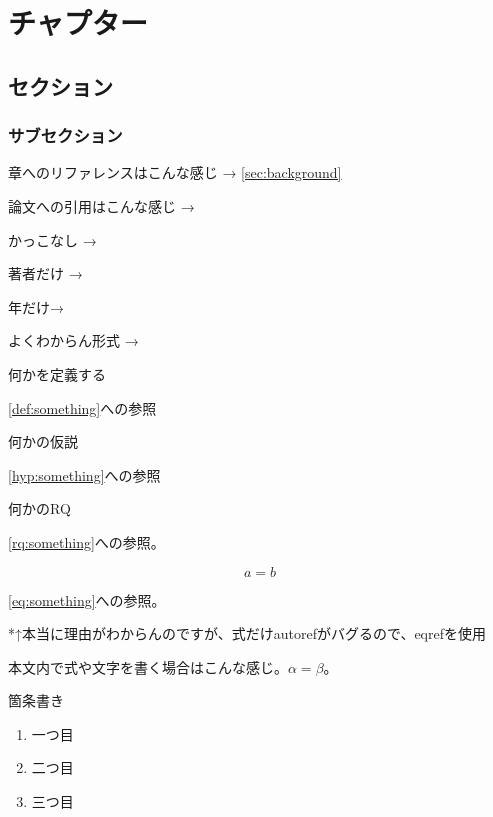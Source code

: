 \chapter{チャプター}

\section{セクション}
\label{sec:background}


\subsection{サブセクション}

章へのリファレンスはこんな感じ → \autoref{sec:background}

論文への引用はこんな感じ → \citep{alexnet}

かっこなし → \citealt{alexnet}

著者だけ → \citeauthor{alexnet}

年だけ→\citeyear{alexnet}

よくわからん形式 → \cite{alexnet}

\begin{definition}
\label{def:something}
何かを定義する
\end{definition}

\autoref{def:something}への参照

\begin{hypothesis}
\label{hyp:something}
何かの仮説
\end{hypothesis}

\autoref{hyp:something}への参照

\begin{researchquestion}
\label{rq:something}
何かのRQ
\end{researchquestion}

\autoref{rq:something}への参照。


\begin{equation}
\label{eq:something}
    a=b
\end{equation}

\eqref{eq:something}への参照。

*↑本当に理由がわからんのですが、式だけautorefがバグるので、eqrefを使用

本文内で式や文字を書く場合はこんな感じ。$\alpha = \beta$。

箇条書き

\begin{enumerate}
  \item 一つ目
  \item 二つ目
  \item 三つ目
\end{enumerate}

